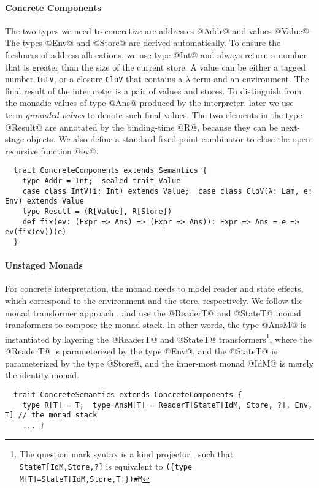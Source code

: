 \paragraph{Concrete Components}
The two types we need to concretize are addresses @Addr@ and values @Value@. The
types @Env@ and @Store@ are derived automatically. To ensure the freshness of
address allocations, we use type @Int@ and always return a number that is greater
than the size of the current store.
A value can be either a tagged number \texttt{IntV}, or a closure
\texttt{CloV} that contains a $\lambda$-term and an environment. The final
result of the interpreter is a pair of values and stores.
To distinguish from the monadic values of type @Ans@ produced by the
interpreter, later we use term \textit{grounded values} to denote such final values.
The two elements in the type @Result@ are annotated by the binding-time @R@,
because they can be next-stage objects.  We also define a standard fixed-point
combinator to close the open-recursive function @ev@.
\begin{lstlisting}
  trait ConcreteComponents extends Semantics {
    type Addr = Int;  sealed trait Value
    case class IntV(i: Int) extends Value;  case class CloV(λ: Lam, e: Env) extends Value
    type Result = (R[Value], R[Store])
    def fix(ev: (Expr => Ans) => (Expr => Ans)): Expr => Ans = e => ev(fix(ev))(e)
  }
\end{lstlisting}

\paragraph{Unstaged Monads}
For concrete interpretation, the monad needs to model reader and state effects,
which correspond to the environment and the store, respectively. We follow the
monad transformer approach \cite{DBLP:conf/popl/LiangHJ95},
and use the @ReaderT@ and @StateT@ monad transformers to
compose the monad stack. In other words, the type @AnsM@ is
instantiated by layering the @ReaderT@ and @StateT@ transformers\footnote{The
question mark syntax is a kind projector \cite{kindprojector}, such that
\texttt{StateT[IdM,Store,?]} is equivalent to \newline \texttt{(\{type
M[T]=StateT[IdM,Store,T]\})\#M}}, where the @ReaderT@ is parameterized by the
type @Env@, and the @StateT@ is parameterized by the type @Store@, and the
inner-most monad @IdM@ is merely the identity monad.
\begin{lstlisting}
  trait ConcreteSemantics extends ConcreteComponents {
    type R[T] = T;  type AnsM[T] = ReaderT[StateT[IdM, Store, ?], Env, T] // the monad stack
    ... }
\end{lstlisting}

